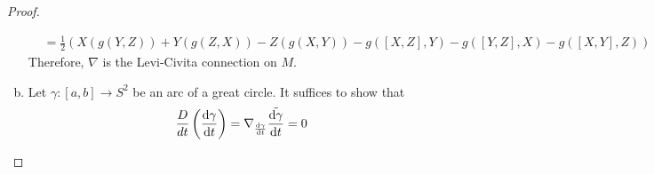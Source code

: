 \documentclass[a4paper]{article}
\begin{document}
\begin{proof}
\begin{enumerate}[(a)]
\[\begin{aligned}
                           &= \frac{1}{2}\left( X( g( Y, Z)) + Y(g(Z,X)) - Z(g(X, Y)) - g([X, Z], Y) - g([Y, Z], X) - g([X, Y], Z) \right)
        \end{aligned}
      \]
      Therefore, $\nabla$ is the Levi-Civita connection on $M$.
    \item Let $\gamma: [a,b] \rightarrow S^2$ be an arc of a great circle. It suffices to show that
      \[
        \frac{D}{dt} \left( \dv{\gamma}{t} \right) = \nabla_{\dv{\gamma}{t}} \tilde{\dv{\gamma}{t}} = 0
      \]
  \end{enumerate}
\end{proof}
\end{document}
